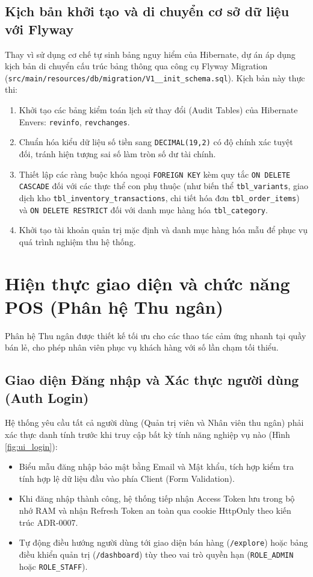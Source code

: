 \subsection{Kịch bản khởi tạo và di chuyển cơ sở dữ liệu với Flyway}
Thay vì sử dụng cơ chế tự sinh bảng nguy hiểm của Hibernate, dự án áp dụng kịch bản di chuyển cấu trúc bảng thông qua công cụ Flyway Migration (\texttt{src/main/resources/db/migration/V1\_\_init\_schema.sql}). Kịch bản này thực thi:
\begin{enumerate}[label=\arabic*., leftmargin=1.5cm]
    \item Khởi tạo các bảng kiểm toán lịch sử thay đổi (Audit Tables) của Hibernate Envers: \texttt{revinfo}, \texttt{revchanges}.
    \item Chuẩn hóa kiểu dữ liệu số tiền sang \texttt{DECIMAL(19,2)} có độ chính xác tuyệt đối, tránh hiện tượng sai số làm tròn số dư tài chính.
    \item Thiết lập các ràng buộc khóa ngoại \texttt{FOREIGN KEY} kèm quy tắc \texttt{ON DELETE CASCADE} đối với các thực thể con phụ thuộc (như biến thể \texttt{tbl\_variants}, giao dịch kho \texttt{tbl\_inventory\_transactions}, chi tiết hóa đơn \texttt{tbl\_order\_items}) và \texttt{ON DELETE RESTRICT} đối với danh mục hàng hóa \texttt{tbl\_category}.
    \item Khởi tạo tài khoản quản trị mặc định và danh mục hàng hóa mẫu để phục vụ quá trình nghiệm thu hệ thống.
\end{enumerate}

\section{Hiện thực giao diện và chức năng POS (Phân hệ Thu ngân)}
\label{sec:hien_thuc_thu_ngan}

Phân hệ Thu ngân được thiết kế tối ưu cho các thao tác cảm ứng nhanh tại quầy bán lẻ, cho phép nhân viên phục vụ khách hàng với số lần chạm tối thiểu.

\subsection{Giao diện Đăng nhập và Xác thực người dùng (Auth Login)}
Hệ thống yêu cầu tất cả người dùng (Quản trị viên và Nhân viên thu ngân) phải xác thực danh tính trước khi truy cập bất kỳ tính năng nghiệp vụ nào (Hình \ref{fig:ui_login}):
\begin{itemize}[leftmargin=1.5cm]
    \item Biểu mẫu đăng nhập bảo mật bằng Email và Mật khẩu, tích hợp kiểm tra tính hợp lệ dữ liệu đầu vào phía Client (Form Validation).
    \item Khi đăng nhập thành công, hệ thống tiếp nhận Access Token lưu trong bộ nhớ RAM và nhận Refresh Token an toàn qua cookie HttpOnly theo kiến trúc ADR-0007.
    \item Tự động điều hướng người dùng tới giao diện bán hàng (\texttt{/explore}) hoặc bảng điều khiển quản trị (\texttt{/dashboard}) tùy theo vai trò quyền hạn (\texttt{ROLE\_ADMIN} hoặc \texttt{ROLE\_STAFF}).
\end{itemize}

